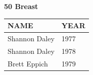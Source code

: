 \begin{table}[H]
\centering
\begin{minipage}[t]{0.6\textwidth}
\centering
\textbf{50 Breast}\\[0.1cm]
\begin{tabular}{@{}p{2.8cm}p{1.2cm}@{}}
\hline
    \textbf{NAME} & \textbf{YEAR} \\
\hline
    Shannon Daley & 1977 \\
    Shannon Daley & 1978 \\
    Brett Eppich & 1979 \\
\hline
\end{tabular}
\end{minipage}
\end{table}


